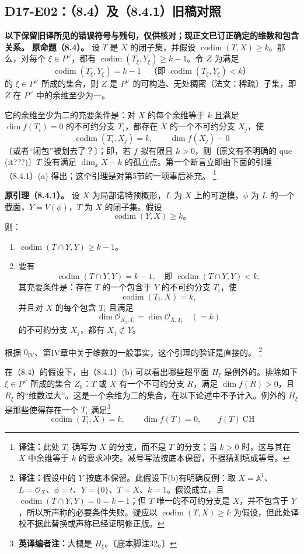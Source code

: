 \documentclass[UTF8,a4paper]{ctexbook}
\newcommand{\transnote}[1]{\ifhmode\unskip\nobreak\fi\footnote{\textbf{译注：}#1}}
\DeclareMathOperator{\codim}{codim}
\newcommand{\ednote}[1]{\footnote{\textbf{英译编者注：}#1}}
\begin{document}
\subsection*{D17-E02：（8.4）及（8.4.1）旧稿对照}
\noindent\textbf{以下保留旧译所见的错误符号与残句，仅供核对；现正文已订正确定的维数和包含关系。}
\noindent\textbf{原命题（8.4）。}
设 $T$ 是 $X$ 的闭子集，并假设 $\codim(T,X)\geq k$。那么，对每个 $\xi\in P^\vee$，都有 $\codim(T_\xi,Y_\xi)\geq k-1$。令 $Z$ 为满足
\[
\codim(T_\xi,Y_\xi)=k-1
\quad\text{（即 }\codim(T_\xi,Y_\xi)<k\text{）}
\]
的 $\xi\in P^\vee$ 所成的集合，则 $Z$ 是 $P^\vee$ 的可构造、无处稠密〔法文：稀疏〕子集，即 $\overline Z$ 在 $P^\vee$ 中的余维至少为一。

它的余维至少为二的充要条件是：对 $X$ 的每个余维等于 $k$ 且满足 $\dim f(T_i)=0$ 的不可约分支 $T_i$，都存在 $X$ 的一个不可约分支 $X_j$，使
\[
\codim(T_i,X_j)=k,\qquad \dim f(X_j)-0
\]
〔或者“闭包”被划去了？〕；即，若 $f$ 拟有限且 $k>0$，则〔原文有不明确的 que (it???)〕$T$ 没有满足 $\dim_xX-k$ 的孤立点。第一个断言立即由下面的引理（8.4.1）(a) 得出；这个引理是对第5节的一项事后补充。
\transnote{此处 $T_i$ 确写为 $X$ 的分支，而不是 $T$ 的分支；当 $k>0$ 时，这与其在 $X$ 中余维等于 $k$ 的要求冲突。减号写法按底本保留，不据猜测填成等号。}

\par\noindent\textbf{原引理（8.4.1）。}
设 $X$ 为局部诺特预概形，$L$ 为 $X$ 上的可逆模，$\phi$ 为 $L$ 的一个截面，$Y=V(\phi)$，$T$ 为 $X$ 的闭子集。假设
\[
\codim(Y,X)\geq k\text{。}
\]
则：
\begin{enumerate}
\item[(a)] $\codim(T\cap Y,Y)\geq k-1$。
\item[(b)] 要有
\[
\codim(T\cap Y,Y)=k-1,
\quad\text{即 }\codim(T\cap Y,Y)<k,
\]
其充要条件是：存在 $T$ 的一个包含于 $Y$ 的不可约分支 $T_i$，使
\[\codim(T_i,X)=k,\]
并且对 $X$ 的每个包含 $T_i$ 且满足
\[
\dim\mathcal O_{X_j,T_i}=\dim\mathcal O_{X,T_i}\quad(=k)
\]
的不可约分支 $X_j$，都有 $X_j\not\subset Y$。
\end{enumerate}
根据 $0_{\mathrm{IV}}$、第IV章中关于维数的一般事实，这个引理的验证是直接的。
\transnote{假设中的 $Y$ 按底本保留。此假设下(b)有明确反例：取 $X=\mathbb A^1$、$L=\mathcal O_X$、$\phi=t$、$Y=\{0\}$、$T=X$、$k=1$。假设成立，且 $\codim(T\cap Y,Y)=0=k-1$；但 $T$ 唯一的不可约分支是 $X$，并不包含于 $Y$，所以所声称的必要条件失败。疑应以 $\codim(T,X)\geq k$ 为假设，但此处译校不据此替换或声称已经证明修正版。}

在（8.4）的假设下，由（8.4.1）(b) 可以看出哪些超平面 $H_\xi$ 是例外的。排除如下 $\xi\in P^\vee$ 所成的集合 $Z_0$：$T$ 或 $X$ 有一个不可约分支 $R$，满足 $\dim f(R)>0$，且 $R_\xi$ 的“维数过大”。这是一个余维为二的集合，在以下论述中不予计入。例外的 $H_\xi$ 是那些使得存在一个 $T_i$ 满足\ednote{大概是 $H_\xi$。〔底本脚注32。〕}
\[
\codim(T_i,X)=k,\qquad\dim f(T)=0,\qquad f(T)\ \mathrm{CH}
\]
\end{document}
